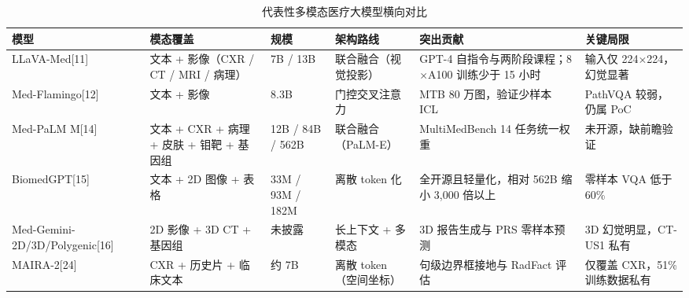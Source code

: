 \begin{table}[htbp]
\centering
\caption{代表性多模态医疗大模型横向对比}
\label{tab:mm-compare}
\scriptsize
\begin{tabularx}{\textwidth}{L{2.1cm} L{2.8cm} L{1.4cm} L{2.2cm} Y Y}
\toprule
模型 & 模态覆盖 & 规模 & 架构路线 & 突出贡献 & 关键局限 \\
\midrule
LLaVA-Med[11] & 文本 + 影像（CXR / CT / MRI / 病理） & 7B / 13B & 联合融合（视觉投影） & GPT-4 自指令与两阶段课程；8$\times$A100 训练少于 15 小时 & 输入仅 224$\times$224，幻觉显著 \\
Med-Flamingo[12] & 文本 + 影像 & 8.3B & 门控交叉注意力 & MTB 80 万图，验证少样本 ICL & PathVQA 较弱，仍属 PoC \\
Med-PaLM M[14] & 文本 + CXR + 病理 + 皮肤 + 钼靶 + 基因组 & 12B / 84B / 562B & 联合融合（PaLM-E） & MultiMedBench 14 任务统一权重 & 未开源，缺前瞻验证 \\
BiomedGPT[15] & 文本 + 2D 图像 + 表格 & 33M / 93M / 182M & 离散 token 化 & 全开源且轻量化，相对 562B 缩小 3,000 倍以上 & 零样本 VQA 低于 60\% \\
Med-Gemini-2D/3D/Polygenic[16] & 2D 影像 + 3D CT + 基因组 & 未披露 & 长上下文 + 多模态 & 3D 报告生成与 PRS 零样本预测 & 3D 幻觉明显，CT-US1 私有 \\
MAIRA-2[24] & CXR + 历史片 + 临床文本 & 约 7B & 离散 token（空间坐标） & 句级边界框接地与 RadFact 评估 & 仅覆盖 CXR，51\% 训练数据私有 \\
\bottomrule
\end{tabularx}
\end{table}
